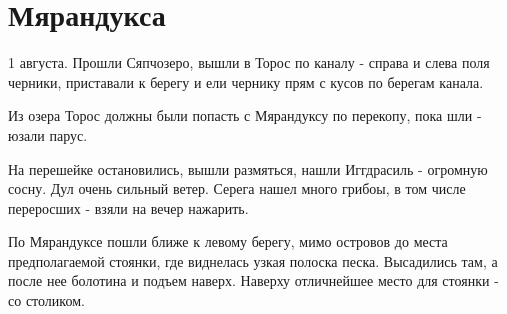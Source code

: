 \chapter{Мярандукса}
\vepsianrose

1 августа. Прошли Сяпчозеро, вышли в Торос по каналу - справа и слева поля черники, приставали к берегу и ели чернику прям с кусов по берегам канала. 

Из озера Торос должны были попасть с Мярандуксу по перекопу, пока шли - юзали парус.

На перешейке остановились, вышли размяться, нашли Иггдрасиль - огромную сосну. Дул очень сильный ветер. Серега нашел много грибоы, в том числе переросших - взяли на вечер нажарить.

По Мярандуксе пошли ближе к левому берегу, мимо островов до места предполагаемой стоянки, где виднелась узкая полоска песка. Высадились там, а после нее болотина и подъем наверх. Наверху отличнейшее место для стоянки - со столиком. 

\begin{center}
\end{center}
